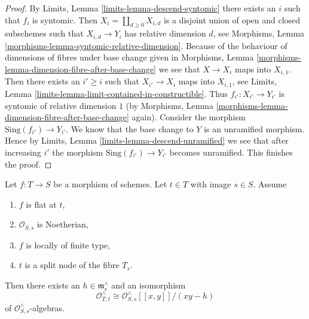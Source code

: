 \begin{proof}
By Limits, Lemma \ref{limits-lemma-descend-syntomic}
there exists an $i$ such that $f_i$ is syntomic.
Then $X_i = \coprod_{d \geq 0} X_{i, d}$ is a disjoint union of
open and closed subschemes such that $X_{i, d} \to Y_i$
has relative dimension $d$, see
Morphisms, Lemma \ref{morphisms-lemma-syntomic-relative-dimension}.
Because of the behaviour of dimensions of fibres under base change given in
Morphisms, Lemma \ref{morphisms-lemma-dimension-fibre-after-base-change}
we see that $X \to X_i$ maps into $X_{i, 1}$.
Then there exists an $i' \geq i$ such that $X_{i'} \to X_i$
maps into $X_{i, 1}$, see
Limits, Lemma \ref{limits-lemma-limit-contained-in-constructible}.
Thus $f_{i'} : X_{i'} \to Y_{i'}$ is syntomic of relative dimension $1$
(by Morphisms, Lemma \ref{morphisms-lemma-dimension-fibre-after-base-change}
again).
Consider the morphism $\text{Sing}(f_{i'}) \to Y_{i'}$.
We know that the base change to $Y$ is an unramified morphism.
Hence by Limits, Lemma \ref{limits-lemma-descend-unramified}
we see that after increasing $i'$ the morphism
$\text{Sing}(f_{i'}) \to Y_{i'}$ becomes unramified.
This finishes the proof.
\end{proof}

\begin{lemma}
\label{lemma-formal-local-structure-nodal-family}
Let $f : T \to S$ be a morphism of schemes. Let $t \in T$
with image $s \in S$. Assume
\begin{enumerate}
\item $f$ is flat at $t$,
\item $\mathcal{O}_{S, s}$ is Noetherian,
\item $f$ is locally of finite type,
\item $t$ is a split node of the fibre $T_s$.
\end{enumerate}
Then there exists an $h \in \mathfrak m_s^\wedge$ and an isomorphism
$$
\mathcal{O}_{T, t}^\wedge \cong
\mathcal{O}_{S, s}^\wedge[[x, y]]/(xy - h)
$$
of $\mathcal{O}_{S, s}^\wedge$-algebras.
\end{lemma}

